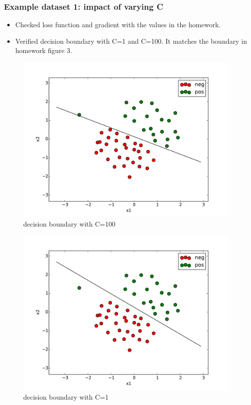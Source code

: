 \documentclass{article}
\begin{document}
\subsubsection{Example dataset 1: impact of varying C}
\begin{itemize}
	\item Checked loss function and gradient with the values in the homework.
	\item Verified decision boundary with C=1 and C=100. It matches the boundary in homework figure 3.
\end{itemize}
\begin{figure}[H]
	\centering
	\includegraphics[width=1\linewidth]{./fig2}
	\caption{decision boundary with C=100}\label{fig:3.11}
\end{figure}
\begin{figure}[H]
	\centering
	\includegraphics[width=1\linewidth]{./fig2_1}
	\caption{decision boundary with C=1}\label{fig:3.12}
\end{figure}
\end{document}
